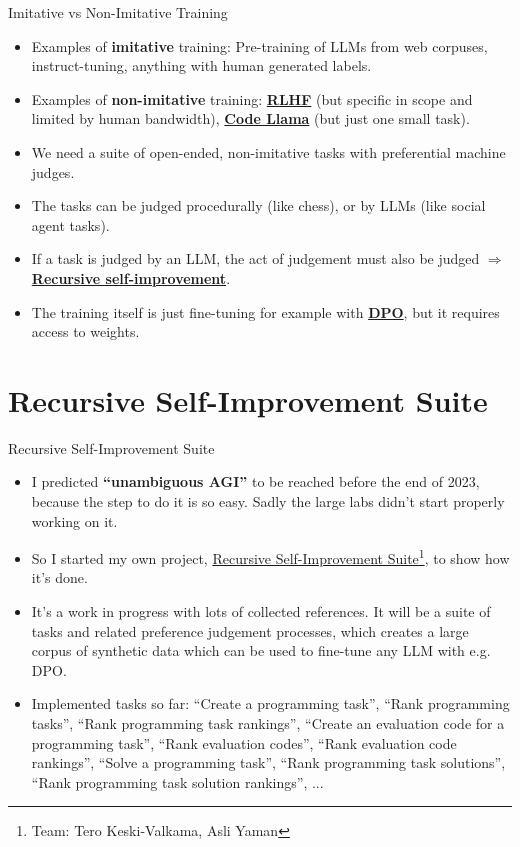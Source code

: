 \documentclass{beamer}
\begin{document}
\begin{frame}{Imitative vs Non-Imitative Training}
  \begin{itemize}
   \item Examples of \textbf{imitative} training: Pre-training of LLMs from web corpuses, instruct-tuning, anything with human generated labels.
   \item Examples of \textbf{non-imitative} training: \textcolor{blue}{\href{https://arxiv.org/abs/1909.08593}{\textbf{RLHF}}} (but specific in scope and limited by human bandwidth), \textcolor{blue}{\href{https://about.fb.com/news/2023/08/code-llama-ai-for-coding/}{\textbf{Code Llama}}} (but just one small task).
   \item We need a suite of open-ended, non-imitative tasks with preferential machine judges.
   \item The tasks can be judged procedurally (like chess), or by LLMs (like social agent tasks).
   \item If a task is judged by an LLM, the act of judgement must also be judged $\Rightarrow$ \textcolor{blue}{\href{https://github.com/keskival/recursive-self-improvement-suite}{\textbf{Recursive self-improvement}}}.
   \item The training itself is just fine-tuning for example with \textcolor{blue}{\href{https://arxiv.org/abs/2305.18290}{\textbf{DPO}}}, but it requires access to weights.
  \end{itemize}

\end{frame}

\section{Recursive Self-Improvement Suite}
\begin{frame}{Recursive Self-Improvement Suite}
  \begin{itemize}
   \item I predicted \textbf{``unambiguous AGI''} to be reached before the end of 2023, because the step to do it is so easy. Sadly the large labs didn't start properly working on it.
   \item So I started my own project, \textcolor{blue}{\href{https://github.com/keskival/recursive-self-improvement-suite}{Recursive Self-Improvement Suite}}\footnote{Team: Tero Keski-Valkama, Asli Yaman}, to show how it's done.
   \item It's a work in progress with lots of collected references. It will be a suite of tasks and related preference judgement processes, which creates a large corpus of synthetic data which can be used to fine-tune any LLM with e.g. DPO.
   \item Implemented tasks so far: ``Create a programming task'', ``Rank programming tasks'', ``Rank programming task rankings'', ``Create an evaluation code for a programming task'', ``Rank evaluation codes'', ``Rank evaluation code rankings'', ``Solve a programming task'', ``Rank programming task solutions'', ``Rank programming task solution rankings'', ...
  \end{itemize}
\end{frame}
\end{document}
